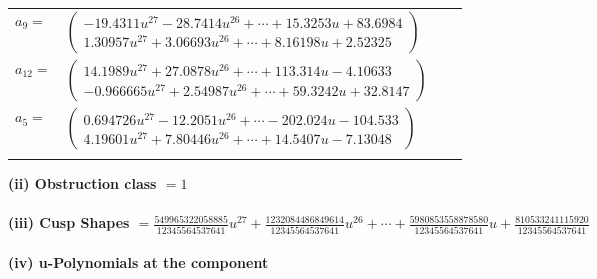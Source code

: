 \documentclass[1p]{elsarticle_modified}
\theoremstyle{definition}
\begin{document}
\begin{tabular}{m{7pt} m{180pt} m{7pt} m{180pt} }
\flushright $a_{9}=$&$\begin{pmatrix}-19.4311 u^{27}-28.7414 u^{26}+\cdots+15.3253 u+83.6984\\1.30957 u^{27}+3.06693 u^{26}+\cdots+8.16198 u+2.52325\end{pmatrix}$ \\
\flushright $a_{12}=$&$\begin{pmatrix}14.1989 u^{27}+27.0878 u^{26}+\cdots+113.314 u-4.10633\\-0.966665 u^{27}+2.54987 u^{26}+\cdots+59.3242 u+32.8147\end{pmatrix}$ \\
\flushright $a_{5}=$&$\begin{pmatrix}0.694726 u^{27}-12.2051 u^{26}+\cdots-202.024 u-104.533\\4.19601 u^{27}+7.80446 u^{26}+\cdots+14.5407 u-7.13048\end{pmatrix}$\\&\end{tabular}
\flushleft \textbf{(ii) Obstruction class $= 1$}\\~\\
\flushleft \textbf{(iii) Cusp Shapes $= \frac{549965322058885}{12345564537641} u^{27}+\frac{1232084486849614}{12345564537641} u^{26}+\cdots+\frac{5980853558878580}{12345564537641} u+\frac{810533241115920}{12345564537641}$}\\~\\
\newpage\renewcommand{\arraystretch}{1}
\flushleft \textbf{(iv) u-Polynomials at the component}\newline \\
\end{document}
